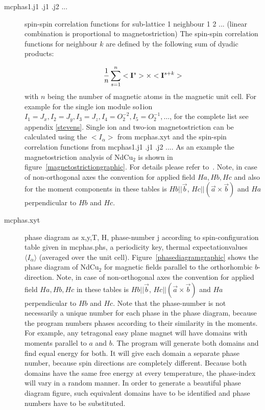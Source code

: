 \begin{description}
\item [\prg mcphas1.j1 .j1 .j2 ...] 
               spin-spin correlation functions for sub-lattice 1 neighbour 1 2 ...
	       (linear combination is proportional to magnetostriction)
	       The spin-spin correlation functions for neighbour $k$ are defined by
	       the following sum of dyadic products:

	       \begin{equation}
	        \frac{1}{n}\sum_{s=1}^n <{\mathbf I}^s> \times  <{\mathbf I}^{s+k}>
	       \end{equation}
	       with $n$ being the number of magnetic atoms in the magnetic unit cell.
                For example for the single ion module {\prg so1ion} $I_1=J_x,I_2=J_y,I_3=J_z,I_4=O_2^{-2},I_5=O_2^{-1}, \dots$, for the complete list see appendix \ref{stevens}.
	       Single ion and two-ion magnetostriction can be calculated using the $<I_{\alpha}>$ from {\prg mcphas.xyt} and the
	       spin-spin correlation functions from {\prg mcphas1.j1 .j1 .j2 ...}. As an example the magnetostriction analysis of
	       NdCu$_2$ is shown in figure~\ref{magnetostrictiongraphic}. For details 
             please refer to~\cite{rotter02-8885}.
                            Note, in case of non-orthogonal axes the convention for applied field $Ha, Hb,Hc$ and
                            also for the moment components in these tables 
                            is $Hb||\vec b$, $Hc||(\vec a \times \vec b)$ and $Ha$ perpendicular to $Hb$ and $Hc$.
\item [\prg mcphas.xyt]    phase diagram as x,y,T, H, phase-number j according to spin-configuration table
               given in mcphas.phs, a periodicity key, thermal expectationvalues $\langle I_{\alpha} \rangle$ (averaged over the unit cell).
 Figure~\ref{phasediagramgraphic}
	       shows the phase diagram of NdCu$_2$ for magnetic fields parallel to the orthorhombic $b$-direction.
                            Note, in case of non-orthogonal axes the convention for applied field $Ha, Hb,Hc$ 
                             in these tables 
                            is $Hb||\vec b$, $Hc||(\vec a \times \vec b)$ and $Ha$ perpendicular to $Hb$ and $Hc$.
              Note that  the phase-number is not necessarily a unique number for each phase in the phase diagram, because
the program numbers phases according to their similarity in the moments. For example, any tetragonal easy plane magnet 
will have domains with moments parallel to $a$ and $b$. The program will generate both domains and find equal energy for both. It will give each domain a separate phase number, because spin directions are completely different. Because both domains have the same free energy at every temperature, the phase-index will vary in a random manner. In order to generate a beautiful phase diagram figure, such equivalent domains have to be identified and phase numbers have to be substituted.

\end{description}
